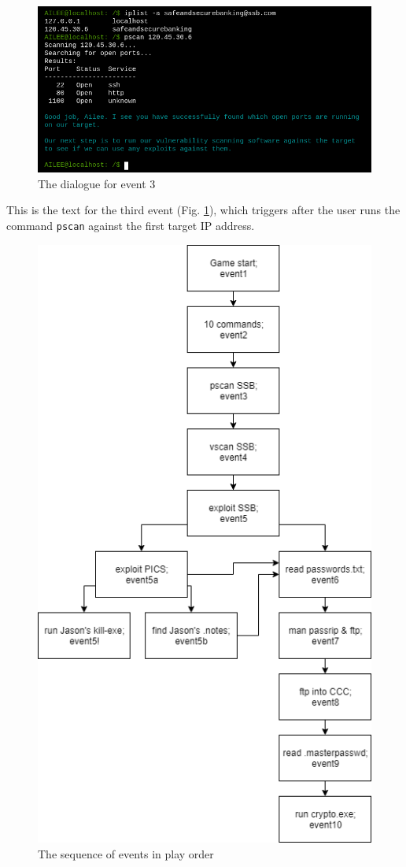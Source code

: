 \documentclass[conference]{IEEEtran}
\begin{document}
\begin{figure}[h]
	\centerline{\includegraphics[scale=1.39]{event3}}
	\caption{The dialogue for event 3}
	\label{fig:event3}
\end{figure}

This is the text for the third event (Fig. \ref{fig:event3}), which triggers after the user runs the command \texttt{pscan} against the first target IP address.

\begin{figure}[h]
    \centerline{\includegraphics[scale=0.5]{gameflow.png}}
    \caption{The sequence of events in play order}
    \label{fig:gameplay-sequence}
\end{figure}
\end{document}
